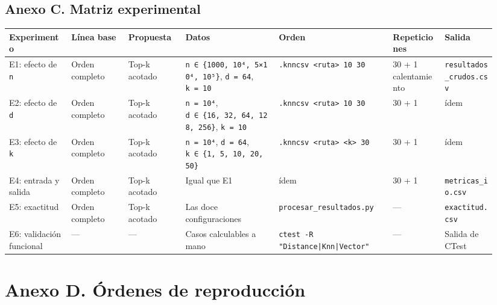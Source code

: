 \documentclass[11pt,a4paper]{article}
\let\subsection\section
\begin{document}
\begin{landscape}
\subsection{Anexo C. Matriz
experimental}\label{anexo-c-matriz-experimental}

\begin{longtable}[]{@{}L{0.12\linewidth}L{0.11\linewidth}L{0.11\linewidth}L{0.18\linewidth}L{0.22\linewidth}C{0.10\linewidth}L{0.10\linewidth}@{}}
\toprule\noalign{}
Experimento & Línea base & Propuesta & Datos & Orden & Repeticiones &
Salida \\
\midrule\noalign{}
\endhead
\bottomrule\noalign{}
\endlastfoot
E1: efecto de \texttt{n} & Orden completo & Top-k acotado &
\texttt{n\ ∈\ \{1000,\ 10⁴,\ 5×10⁴,\ 10⁵\}}, \texttt{d\ =\ 64},
\texttt{k\ =\ 10} &
\texttt{.knncsv\ \textless{}ruta\textgreater{}\ 10\ 30} & 30 + 1
calentamiento & \texttt{resultados\_crudos.csv} \\
E2: efecto de \texttt{d} & Orden completo & Top-k acotado &
\texttt{n\ =\ 10⁴}, \texttt{d\ ∈\ \{16,\ 32,\ 64,\ 128,\ 256\}},
\texttt{k\ =\ 10} &
\texttt{.knncsv\ \textless{}ruta\textgreater{}\ 10\ 30} & 30 + 1 &
ídem \\
E3: efecto de \texttt{k} & Orden completo & Top-k acotado &
\texttt{n\ =\ 10⁴}, \texttt{d\ =\ 64},
\texttt{k\ ∈\ \{1,\ 5,\ 10,\ 20,\ 50\}} &
\texttt{.knncsv\ \textless{}ruta\textgreater{}\ \textless{}k\textgreater{}\ 30}
& 30 + 1 & ídem \\
E4: entrada y salida & Orden completo & Top-k acotado & Igual que E1 &
ídem & 30 + 1 & \texttt{metricas\_io.csv} \\
E5: exactitud & Orden completo & Top-k acotado & Las doce
configuraciones & \texttt{procesar\_resultados.py} & --- &
\texttt{exactitud.csv} \\
E6: validación funcional & --- & --- & Casos calculables a mano &
\texttt{ctest -R "Distance|Knn|Vector"} & --- & Salida de CTest \\
\end{longtable}
\end{landscape}

\subsection{Anexo D. Órdenes de
reproducción}\label{anexo-d-uxf3rdenes-de-reproducciuxf3n}
\end{document}
